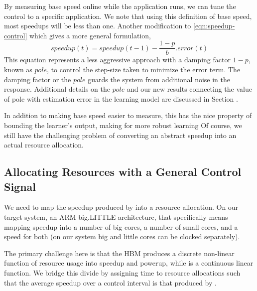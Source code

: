 By measuring
base speed online while the application runs, we can tune the control
to a specific application.  We note that using this definition of base
speed, most speedups will be less than one.  Another modification to \eqref{eqn:speedup-control} which gives a more general formulation,
\begin{equation}
speedup(t) = speedup(t-1) - \frac{1 - p}{b}.error(t)
\end{equation}
This equation represents a less aggressive approach with a damping factor $1-p$, known as $pole$, to control the step-size taken to minimize the error term. The damping factor or the $pole$ guards the system from additional noise in the response. Additional details on the $pole$ and our new results connecting the value of pole with estimation error in the learning model are discussed in Section \secref{}.

In addition to making
base speed easier to measure, this has the nice property of bounding
the learner's output, making for more robust learning 
Of course, we still have the challenging problem of converting an
abstract speedup into an actual resource allocation.


\subsection{Allocating Resources with a General Control Signal}
We need to map the speedup produced by  into a
resource allocation.  On our target system, an ARM big.LITTLE
architecture, that specifically means mapping speedup into a number of
big cores, a number of small cores, and a speed for both (on our
system big and little cores can be clocked separately).

The primary challenge here is that the HBM produces a discrete
non-linear function of resource usage into speedup and powerup, while
 is a continuous linear function.  We bridge
this divide by assigning time to resource allocations such that the
average speedup over a control interval is that produced by
.

